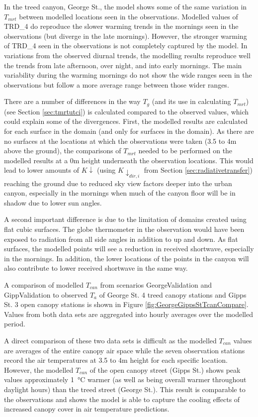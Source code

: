 \documentclass[final,3p,times,authoryear]{elsarticle}
\begin{document}
In the treed canyon, George St., the model shows some of the same variation in $T_{mrt}$ between modelled locations seen in the observations. Modelled values of TRD\_4 do reproduce the slower warming trends in the mornings seen in the observations (but diverge in the late mornings). However, the stronger warming of TRD\_4 seen in the observations is not completely captured by the model. In variations from the observed diurnal trends, the modelling results reproduce well the trends from late afternoon, over night, and into early mornings. The main variability during the warming mornings do not show the wide ranges seen in the observations but follow a more average range between those wider ranges. 

There are a number of differences in the way $T_{g}$ (and its use in calculating $T_{mrt}$) (see Section \ref{sec:tmrtutci}) is calculated compared to the observed values, which could explain some of the divergences. First, the modelled results are calculated for each surface in the domain (and only for surfaces in the domain). As there are no surfaces at the locations at which the observations were taken (3.5 to 4m above the ground), the comparisons of $T_{mrt}$ needed to be performed on the modelled results at a 0m height underneath the observation locations. This would lead to lower amounts of $K\downarrow$ (using $K\downarrow_{dir,i}$ from Section \ref{sec:radiativetransfer}) reaching the ground due to reduced sky view factors deeper into the urban canyon, especially in the mornings when much of the canyon floor will be in shadow due to lower sun angles.

A second important difference is due to the limitation of domains created using flat cubic surfaces. The globe thermometer in the observation would have been exposed to radiation from all side angles in addition to up and down. As flat surfaces, the modelled points will see a reduction in received shortwave, especially in the mornings. In addition, the lower locations of the points in the canyon will also contribute to lower received shortwave in the same way.


A comparison of modelled $T_{can}$ from scenarios GeorgeValidation and GippValidation to observed $T_{a}$ of George St. 4 treed canopy stations and Gipps St. 3 open canopy stations is shown in Figure \ref{fig:GeorgeGippsStTcanCompare}. Values from both data sets are aggregated into hourly averages over the modelled period. 

A direct comparison of these two data sets is difficult as the modelled $T_{can}$ values are averages of the entire canopy air space while the seven observation stations record the air temperatures at 3.5 to 4m height for each specific location. However, the modelled $T_{can}$ of the open canopy street (Gipps St.) shows peak values approximately 1\SI{}{\degreeCelsius} warmer (as well as being overall warmer throughout daylight hours) than the treed street (George St.). This result is comparable to the \cite{Coutts2015} observations and shows the model is able to capture the cooling effects of increased canopy cover in air temperature predictions.
\end{document}
